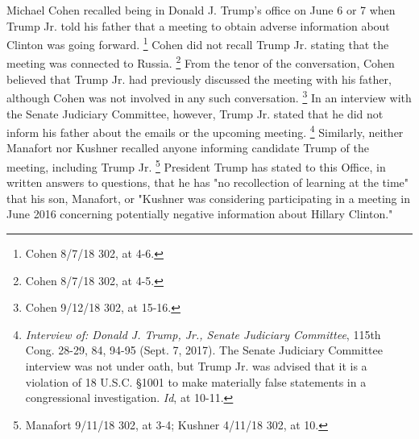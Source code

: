 Michael Cohen recalled being in Donald J. Trump's office on June 6 or 7 when Trump Jr. told his father that a meeting to obtain adverse information about Clinton was going forward.%
\footnote{Cohen 8/7/18 302, at 4-6.}
Cohen did not recall Trump Jr. stating that the meeting was connected to Russia.%
\footnote{Cohen 8/7/18 302, at 4-5.}
From the tenor of the conversation, Cohen believed that Trump Jr. had previously discussed the meeting with his father, although Cohen was not involved in any such conversation.%
\footnote{Cohen 9/12/18 302, at 15-16.}
In an interview with the Senate Judiciary Committee, however, Trump Jr. stated that he did not inform his father about the emails or the upcoming meeting.%
\footnote{\textit{Interview of: Donald J. Trump, Jr., Senate Judiciary Committee}, 115th Cong. 28-29, 84, 94-95
(Sept. 7, 2017). 
The Senate Judiciary Committee interview was not under oath, but Trump Jr. was advised that it is a violation of 18 U.S.C. \S 1001 to make materially false statements in a congressional investigation.
\textit{Id}, at 10-11.}
Similarly, neither Manafort nor Kushner recalled anyone informing candidate Trump of the meeting, including Trump Jr.%
\footnote{Manafort 9/11/18 302, at 3-4; 
Kushner 4/11/18 302, at 10.}
President Trump has stated to this Office, in written answers to questions, that he has "no recollection of learning at the time" that his son, Manafort, or "Kushner was considering participating in a meeting in June 2016 concerning potentially negative information about Hillary Clinton."%
